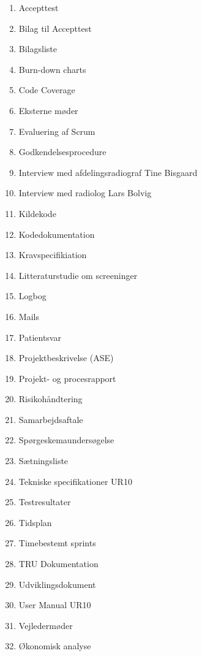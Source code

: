 \begin{enumerate}
\item Accepttest 					 					\label{Accepttest}
\item Bilag til Accepttest								\label{BilagAccepttest}
\item Bilagsliste								\label{Bilagsliste}
\item Burn-down charts									\label{BurnDown}
\item Code Coverage 									\label{Code Coverage}
\item Eksterne møder									\label{Eksterne moder} 
\item Evaluering af Scrum 								\label{Evaluering Scrum} 
\item Godkendelsesprocedure 							\label{Godkendelsesprocedure}
\item Interview med afdelingsradiograf Tine Bisgaard 	\label{Tine}
\item Interview med radiolog Lars Bolvig  				\label{Telefoninterview}
\item Kildekode											\label{Kildekode}
\item Kodedokumentation 								\label{Kodedokumentation} 
\item Kravspecifikiation 								\label{Kravspecifikation}
\item Litteraturstudie om screeninger						\label{Litteraturstudie}
\item Logbog											\label{Logbog}
\item Mails												\label{Mails}
\item Patientsvar										\label{Patientsvar} 
\item Projektbeskrivelse (ASE) 							\label{Projektbeskrivelse}
\item Projekt- og procesrapport 						\label{Projekt- og procesrapport}
\item Risikohåndtering 									\label{Risikohandtering} 
\item Samarbejdsaftale									\label{Samarbejdsaftale} 
\item Spørgeskemaundersøgelse 							\label{Sporgeskemaundersogelse}
\item Sætningsliste 									\label{Satningsliste}
\item Tekniske specifikationer UR10						\label{UR10spec}
\item Testresultater 									\label{TestResultater}
\item Tidsplan											\label{Tidsplan}
\item Timebestemt sprints 								\label{Timebestemt sprints}
\item TRU Dokumentation 								\label{TRUDokumentation}
\item Udviklingsdokument 								\label{Udviklingsdokument}
\item User Manual UR10 									\label{UserManualUR10}
\item Vejledermøder										\label{Vejledermoder}
\item Økonomisk analyse					\label{Okonomi}
\end{enumerate}




